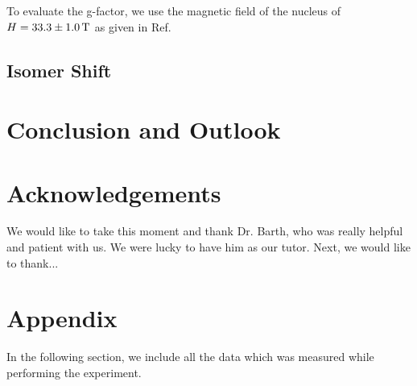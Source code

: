 \documentclass[a4paper]{report}
\numberwithin{equation}{section}
\begin{document}
To evaluate the g-factor, we use the magnetic field of the nucleus of $H = \SI{33.3 \pm 1.0}{\tesla}$ as given in Ref. \cite{k2212016}


\section{Isomer Shift}




\chapter{Conclusion and Outlook}

\chapter{Acknowledgements}
We would like to take this moment and thank Dr. Barth, who was really helpful and patient with us. We were lucky to have him as our tutor. Next, we would like to thank...


\printbibliography

\chapter{Appendix} \label{sec:Appendix}

In the following section, we include all the data which was measured while performing the experiment.
\end{document}
